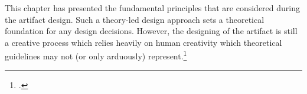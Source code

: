 
This chapter has presented the fundamental principles that are considered during the artifact design. Such a theory-led design approach sets a theoretical foundation for any design decisions. However, the designing of the artifact is still a creative process which relies heavily on human creativity which theoretical guidelines may not (or only arduously) represent.\footcites[Cf.][p.7]{VaishnaviDesignScienceResearch}